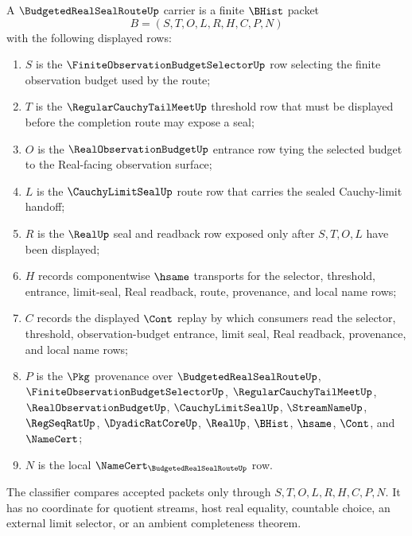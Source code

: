 \begin{definition}
\label{def:budgeted-real-seal-route-carrier}
A $\BudgetedRealSealRouteUp$ carrier is a finite $\BHist$ packet
$$
B=(S,T,O,L,R,H,C,P,N)
$$
with the following displayed rows:
\begin{enumerate}
\item $S$ is the $\FiniteObservationBudgetSelectorUp$ row selecting the finite observation budget used by the route;
\item $T$ is the $\RegularCauchyTailMeetUp$ threshold row that must be displayed before the completion route may expose a seal;
\item $O$ is the $\RealObservationBudgetUp$ entrance row tying the selected budget to the Real-facing observation surface;
\item $L$ is the $\CauchyLimitSealUp$ route row that carries the sealed Cauchy-limit handoff;
\item $R$ is the $\RealUp$ seal and readback row exposed only after $S,T,O,L$ have been displayed;
\item $H$ records componentwise $\hsame$ transports for the selector, threshold, entrance, limit-seal, Real readback, route, provenance, and local name rows;
\item $C$ records the displayed $\Cont$ replay by which consumers read the selector, threshold, observation-budget entrance, limit seal, Real readback, provenance, and local name rows;
\item $P$ is the $\Pkg$ provenance over $\BudgetedRealSealRouteUp$, $\FiniteObservationBudgetSelectorUp$, $\RegularCauchyTailMeetUp$, $\RealObservationBudgetUp$, $\CauchyLimitSealUp$, $\StreamNameUp$, $\RegSeqRatUp$, $\DyadicRatCoreUp$, $\RealUp$, $\BHist$, $\hsame$, $\Cont$, and $\NameCert$;
\item $N$ is the local $\NameCert_{\BudgetedRealSealRouteUp}$ row.
\end{enumerate}
The classifier compares accepted packets only through $S,T,O,L,R,H,C,P,N$. It has no coordinate for quotient streams, host real equality, countable choice, an external limit selector, or an ambient completeness theorem.
\end{definition}

